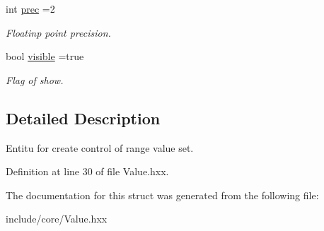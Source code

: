 \begin{DoxyCompactItemize}
int \mbox{\hyperlink{structeven_1_1_value_1_1_property_a50b5a79c82d38b4d3a0bb0b8bb3a29ff}{prec}} =2
\begin{DoxyCompactList}\small\item\em Floatinp point precision. \end{DoxyCompactList}\item 
\mbox{\label{structeven_1_1_value_1_1_property_acedcee873d0af23e0091089c0b24f00b}} 
bool \mbox{\hyperlink{structeven_1_1_value_1_1_property_acedcee873d0af23e0091089c0b24f00b}{visible}} =true
\begin{DoxyCompactList}\small\item\em Flag of show. \end{DoxyCompactList}\end{DoxyCompactItemize}


\subsection{Detailed Description}
Entitu for create control of range value set. 

Definition at line 30 of file Value.\+hxx.



The documentation for this struct was generated from the following file\+:\begin{DoxyCompactItemize}
\item 
include/core/Value.\+hxx\end{DoxyCompactItemize}
